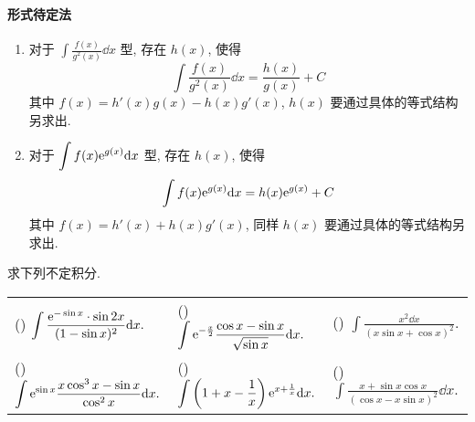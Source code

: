 \paragraph{形式待定法}
\begin{enumerate}[label=(\arabic{*})]
    \item 对于 $\displaystyle\int\frac{f(x)}{g^2(x)}\dd x$ 型, 存在 $h(x)$, 使得 $$\displaystyle\int\frac{f(x)}{g^2(x)}\dd x=\frac{h(x)}{g(x)}+C$$
          其中 $f(x)=h'(x)g(x)-h(x)g'(x)$, $h(x)$ 要通过具体的等式结构另求出.
    \item 对于 $\displaystyle\int f(x)\mathrm{e} ^{g(x)}\dd x$ 型, 存在 $h(x)$, 使得 $$\displaystyle\int f(x)\mathrm{e} ^{g(x)}\dd x=h(x)\mathrm{e} ^{g(x)}+C$$
          其中 $f(x)=h'(x)+h(x)g'(x)$, 同样 $h(x)$ 要通过具体的等式结构另求出.
\end{enumerate}

\begin{example}
    求下列不定积分.
    \setcounter{magicrownumbers}{0}
    \begin{table}[H]
        \centering
        \begin{tabular}{l | l | l}
            (\rownumber{}) $\displaystyle\int\frac{\mathrm{e} ^{-\sin x}\cdot\sin 2x}{(1-\sin x)^2}\dd x.$ & (\rownumber{}) $\displaystyle\int\mathrm{e} ^{-\frac{x}{2}}\frac{\cos x-\sin x}{\sqrt{\sin x}}\dd x.$ & (\rownumber{}) $\displaystyle\int\frac{x^2\dd x}{(x\sin x+\cos x)^2}.$            \\
            (\rownumber{}) $\displaystyle\int\mathrm{e} ^{\sin x}\frac{x\cos^3x-\sin x}{\cos^2x}\dd x.$    & (\rownumber{}) $\displaystyle\int\left(1+x-\dfrac{1}{x}\right)\mathrm{e} ^{x+\frac{1}{x}}\dd x.$      & (\rownumber{}) $\displaystyle\int\frac{x+\sin x\cos x}{(\cos x-x\sin x)^2}\dd x.$
        \end{tabular}
    \end{table}
\end{example}

